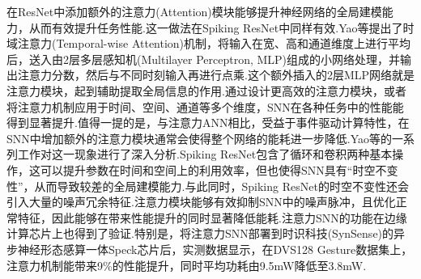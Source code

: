 \documentclass{SCIS2020cn}
\begin{document}
在ResNet中添加额外的注意力(Attention)模块能够提升神经网络的全局建模能力，从而有效提升任务性能\cite{graves2014generatingsequencesrecurrentneural, bahdanau2014neural, vaswani2017attention}.这一做法在Spiking ResNet中同样有效.Yao等\cite{Yao_2021_ICCV}提出了时域注意力(Temporal-wise Attention)机制，将输入在宽、高和通道维度上进行平均后，送入由2层多层感知机(Multilayer Perceptron, MLP)组成的小网络处理，并输出注意力分数，然后与不同时刻输入再进行点乘.这个额外插入的2层MLP网络就是注意力模块，起到辅助提取全局信息的作用.通过设计更高效的注意力模块\cite{Yao_2023_ICCV,yao2023sparser,xu2023enhancing}，或者将注意力机制应用于时间、空间、通道等多个维度\cite{10032591,zhu2022tcja}，SNN在各种任务中的性能能得到显著提升.值得一提的是，与注意力ANN相比，受益于事件驱动计算特性，在SNN中增加额外的注意力模块通常会使得整个网络的能耗进一步降低.Yao等的一系列工作\cite{yao2023sparser,10032591,Yao_2023_ICCV,Yao2024}对这一现象进行了深入分析.Spiking ResNet包含了循环和卷积两种基本操作，这可以提升参数在时间和空间上的利用效率，但也使得SNN具有“时空不变性\cite{huang2022tada}”，从而导致较差的全局建模能力\cite{wang2018non}.与此同时，Spiking ResNet的时空不变性还会引入大量的噪声冗余特征\cite{Yao_2023_ICCV}.注意力模块能够有效抑制SNN中的噪声脉冲，且优化正常特征，因此能够在带来性能提升的同时显著降低能耗.注意力SNN的功能在边缘计算芯片上也得到了验证\cite{Yao2024,kim2023c,chang202373}.特别是，将注意力SNN部署到时识科技(SynSense)的异步神经形态感算一体Speck芯片\cite{Yao2024}后，实测数据显示，在DVS128 Gesture数据集上，注意力机制能带来9\%的性能提升，同时平均功耗由9.5mW降低至3.8mW.
\begin{figure}[h!]
\centering
{}
\label{fig: self attention}
\end{figure}
\end{document}

